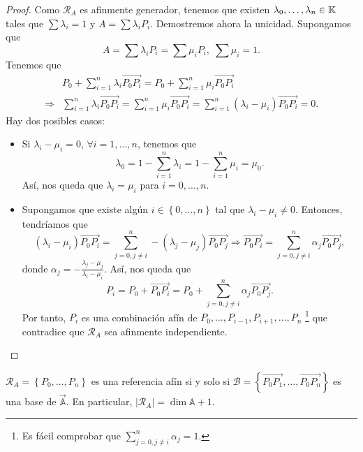 \begin{proof}
Como $\displaystyle \mathcal{R}_{A} $ es afinmente generador, tenemos que existen $\displaystyle \lambda_{0}, \ldots, \lambda_{n} \in \mathbb{K} $ tales que $\displaystyle \sum\lambda_{i} = 1 $ y $\displaystyle A = \sum\lambda_{i}P_{i} $. Demostremos ahora la unicidad. Supongamos que 
\[A = \sum\lambda_{i}P_{i} = \sum\mu_{i}P_{i}, \; \sum\mu_{i} = 1 .\]
Tenemos que
\[
\begin{split}
& P_{0} + \sum^{n}_{i = 1}\lambda_{i}\overrightarrow{P_{0}P_{i}} = P_{0} + \sum^{n}_{i = 1}\mu_{i} \overrightarrow{P_{0}P_{i}} \\
	\Rightarrow & \sum^{n}_{i = 1}\lambda_{i}\overrightarrow{P_{0}P_{i}} = \sum^{n}_{i = 1}\mu_{i}\overrightarrow{P_{0}P_{i}} = \sum^{n}_{i = 1}\left(\lambda_{i}-\mu_{i}\right)\overrightarrow{P_{0}P_{i}} = 0.
\end{split}
\]
Hay dos posibles casos:
\begin{itemize}
\item Si $\displaystyle \lambda_{i}-\mu_{i} = 0 $, $\displaystyle \forall i = 1, \ldots, n $, tenemos que 
	\[\lambda_{0} = 1 - \sum^{n}_{i = 1}\lambda_{i} = 1 - \sum^{n}_{i = 1}\mu_{i} = \mu_{0} .\]
	Así, nos queda que $\displaystyle \lambda_{i} = \mu_{i} $ para $\displaystyle i = 0, \ldots, n $.
\item Supongamos que existe algún $\displaystyle i \in \left\{ 0, \ldots, n\right\}  $ tal que $\displaystyle \lambda_{i}-\mu_{i} \neq 0 $. Entonces, tendríamos que 
	\[\left(\lambda_{i}-\mu_{i}\right)\overrightarrow{P_{0}P_{i}} = \sum^{n}_{j = 0, j \neq i}-\left(\lambda_{j}-\mu_{j}\right)\overrightarrow{P_{0}P_{j}} \Rightarrow \overrightarrow{P_{0}P_{i}} = \sum^{n}_{j = 0, j \neq i}\alpha_{j}\overrightarrow{P_{0}P_{j}} ,\]
donde $\displaystyle \alpha_{j} = -\frac{\lambda_{j}-\mu_{j}}{\lambda_{i}-\mu_{i}} $. Así, nos queda que
\[P_{i} = P_{0} + \overrightarrow{P_{0}P_{i}} = P_{0}+\sum^{n}_{j = 0, j \neq i}\alpha_{j}\overrightarrow{P_{0}P_{j}} .\]
Por tanto, $\displaystyle P_{i} $ es una combinación afín de $\displaystyle P_{0}, \ldots, P_{i-1}, P_{i+1}, \ldots, P_{n} $ \footnote{Es fácil comprobar que $\displaystyle \sum^{n}_{j=0, j \neq i}\alpha_{j} = 1$.}  que contradice que $\displaystyle \mathcal{R}_{A} $ sea afinmente independiente. 
\end{itemize}
\end{proof}
\begin{lema}
	$\displaystyle \mathcal{R}_{A} = \left\{ P_{0}, \ldots, P_{n}\right\}  $ es una referencia afín si y solo si $\displaystyle \mathcal{B} = \left\{ \overrightarrow{P_{0}P_{1}}, \ldots, \overrightarrow{P_{0}P_{n}}\right\}  $ es una base de $\displaystyle \vec{\mathbb{A}} $. En particular, $\displaystyle \left|\mathcal{R}_{A}\right| = \dim\mathbb{A} + 1$. 
\end{lema}
